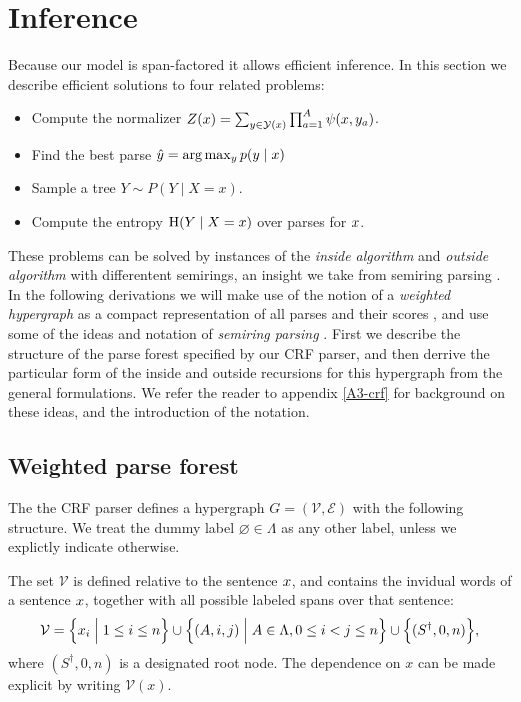 \section{Inference}
  \label{sect:inference}
  Because our model is span-factored it allows efficient inference. In this section we describe efficient solutions to four related problems:
  \begin{itemize}
    \item Compute the normalizer $Z(x) = \sum_{ y \in \mathcal{Y}(x) } \prod_{ a=1 }^{ A } \psi( x, y_a )$.
    \item Find the best parse $\hat{ y } = \arg \max_{y } p(y  \mid x)$
    \item Sample a tree $Y \sim P(Y \mid X = x)$.
    \item Compute the entropy $\operatorname{H}(Y \mid X = x)$ over parses for $x$.
  \end{itemize}
  These problems can be solved by instances of the \textit{inside algorithm} and \textit{outside algorithm} \citep{baker1979trainable} with differentent semirings, an insight we take from semiring parsing \citep{goodman1999semiring}. In the following derivations we will make use of the notion of a \textit{weighted hypergraph} as a compact representation of all parses and their scores \citep{gallo1993directed,klein2004parsing}, and use some of the ideas and notation of \textit{semiring parsing} \citep{goodman1999semiring,eisner2009semirings}. First we describe the structure of the parse forest specified by our CRF parser, and then derrive the particular form of the inside and outside recursions for this hypergraph from the general formulations. We refer the reader to appendix \ref{A3-crf} for background on these ideas, and the introduction of the notation.

  \subsection{Weighted parse forest}
    The the CRF parser defines a hypergraph $G = (\mathcal{V}, \mathcal{E})$ with the following structure. We treat the dummy label $\varnothing \in \Lambda$ as any other label, unless we explictly indicate otherwise.

    The set $\mathcal{V}$ is defined relative to the sentence $x$, and contains the invidual words of a sentence $x$, together with all possible labeled spans over that sentence:
    \begin{align*}
      \mathcal{V} = \Big\{ x_i \; \Big\vert \; 1 \leq i \leq n \Big\} \cup \Big\{ (A, i, j) \; \Big\vert \; A \in \Lambda, 0 \leq i < j \leq n \Big\} \cup \Big\{ (S^{\dagger}, 0, n) \Big\},
    \end{align*}
    where $(S^{\dagger}, 0, n)$ is a designated root node. The dependence on $x$ can be made explicit by writing $\mathcal{V}(x)$.

